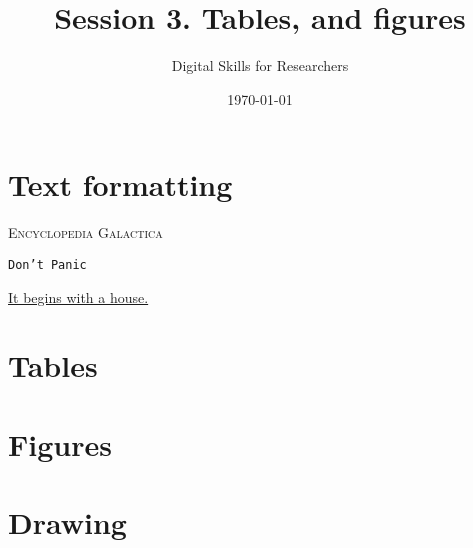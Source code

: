 \documentclass[a4paper,11pt]{article}
\title{Session 3. Tables, and figures}
\author{Digital Skills for Researchers}
\date{\today}
\begin{document}
\maketitle
\tableofcontents

\section{Text formatting}

\textsc{Encyclopedia Galactica}


\texttt{Don't Panic} 


\underline{It begins with a house.}


\section{Tables}

\section{Figures}

\section{Drawing}
\end{document}
